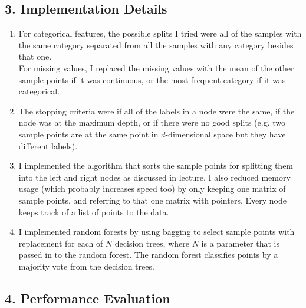 \documentclass{article}
\begin{document}
\subsection*{3. Implementation Details}
\begin{enumerate}[label=\alph*)]
\item
For categorical features, the possible splits I tried were all of the samples with the same category separated from all the samples with any category besides that one.\\
For missing values, I replaced the missing values with the mean of the other sample points if it was continuous, or the most frequent category if it was categorical.
\item
The stopping criteria were if all of the labels in a node were the same, if the node was at the maximum depth, or if there were no good splits (e.g. two sample points are at the same point in $d$-dimensional space but they have different labels).
\item
I implemented the algorithm that sorts the sample points for splitting them into the left and right nodes as discussed in lecture. I also reduced memory usage (which probably increases speed too) by only keeping one matrix of sample points, and referring to that one matrix with pointers. Every node keeps track of a list of points to the data.
\item
I implemented random forests by using bagging to select sample points with replacement for each of $N$ decision trees, where $N$ is a parameter that is passed in to the random forest. The random forest classifies points by a majority vote from the decision trees.
\end{enumerate}

\newpage

\subsection*{4. Performance Evaluation}
\end{document}
